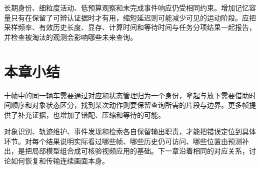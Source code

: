 长期身份、细粒度活动、低预算观察和未完成事件响应仍受相同约束。增加记忆容量只有在保留了可辨认证据时才有用，缩短延迟则可能减少可见的运动阶段。应把采样频率、有效历史长度、显存、计算时间和等待时间与任务分项结果一起报告，并检查被淘汰的观测会影响哪些未来查询。

\section{本章小结}
\label{sec:vision-video-summary}

十帧中的同一辆车需要通过对应和状态管理归为一个身份，拿起与放下需要借助时间顺序和对象状态区分，找到某次动作则要保留查询所需的片段与边界。更多帧提供了补充证据，也增加了错配、压缩和等待的可能。

对象识别、轨迹维护、事件发现和检索各自保留输出职责，才能把错误定位到具体环节。对每个结果说明实际看过哪些帧、哪些历史仍可访问、哪些位置由预测补出，是把局部模型组合成可核验视频应用的基础。下一章沿着相同的对应关系，讨论如何恢复和传输连续画面本身。
